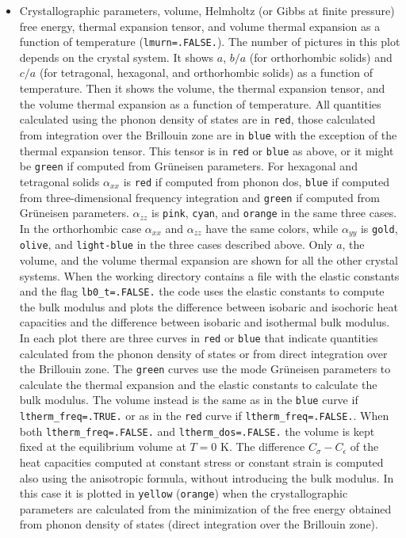 \documentclass[12pt,a4paper]{article}
\begin{document}
\begin{itemize}
\item
Crystallographic parameters, volume, Helmholtz (or Gibbs at finite pressure)
free energy, thermal expansion tensor, and 
volume thermal expansion as a function of temperature 
(\texttt{lmurn=.FALSE.}). The number of
pictures in this plot depends on the crystal system. It shows $a$, 
$b/a$ (for orthorhombic solids) and $c/a$ (for tetragonal, hexagonal, and 
orthorhombic solids) as a function of temperature. Then it shows the
volume, the thermal expansion tensor, and the volume thermal expansion as
a function of temperature. All quantities calculated using the phonon 
density of states are in \texttt{red}, those calculated from integration
over the Brillouin zone are in \texttt{blue} with the exception of the
thermal expansion tensor. This tensor is in \texttt{red} or \texttt{blue}
as above, or it might be \texttt{green} if computed from Gr\"uneisen
parameters. For hexagonal and tetragonal solids $\alpha_{xx}$ is \texttt{red}
if computed from phonon dos, \texttt{blue} if computed from three-dimensional
frequency integration and \texttt{green} if computed from Gr\"uneisen 
parameters. $\alpha_{zz}$ is \texttt{pink}, \texttt{cyan}, and \texttt{orange}
in the same three cases.
In the orthorhombic case $\alpha_{xx}$ and $\alpha_{zz}$ have the same
colors, while $\alpha_{yy}$ is \texttt{gold}, \texttt{olive}, and 
\texttt{light-blue} in the three cases described above.
Only $a$, the volume, and the volume thermal expansion are shown 
for all the other crystal systems.
When the working directory contains a file with the elastic constants and
the flag \texttt{lb0\_t=.FALSE.} the code uses the elastic constants to
compute the bulk modulus and plots the difference between isobaric and
isochoric heat capacities and the difference between isobaric and isothermal
bulk modulus. In each plot there are three curves in \texttt{red} or
\texttt{blue} that indicate quantities calculated
from the phonon density of states or from direct integration over the
Brillouin zone. The \texttt{green} curves use the 
mode Gr\"uneisen parameters to calculate the thermal expansion and
the elastic constants to calculate the bulk modulus. The volume instead
is the same as in the \texttt{blue} curve if \texttt{ltherm\_freq=.TRUE.}
or as in the \texttt{red} curve if \texttt{ltherm\_freq=.FALSE.}.
When both \texttt{ltherm\_freq=.FALSE.} and \texttt{ltherm\_dos=.FALSE.}
the volume is kept fixed at the equilibrium volume at $T=0$ K.
The difference $C_\sigma-C_\epsilon$ of the heat capacities computed at
constant stress or constant strain is computed also using the anisotropic
formula, without introducing the bulk modulus. In this case it is
plotted in \texttt{yellow} (\texttt{orange}) when the crystallographic 
parameters are calculated from the minimization of the free energy 
obtained from phonon density of states (direct integration over the 
Brillouin zone).


\end{itemize}
\end{document}
